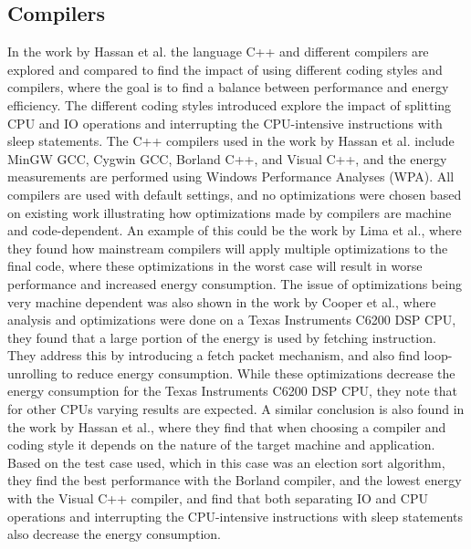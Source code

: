 \subsection{Compilers}
In the work by Hassan et al.\cite{hassan2017} the language C++ and different compilers are explored and compared to find the impact of using different coding styles and compilers, where the goal is to find a balance between performance and energy efficiency. The different coding styles introduced explore the impact of splitting CPU and IO operations and interrupting the CPU-intensive instructions with sleep statements. The C++ compilers used in the work by Hassan et al.\cite{hassan2017} include MinGW GCC, Cygwin GCC, Borland C++, and Visual C++, and the energy measurements are performed using Windows Performance Analyses (WPA). All compilers are used with default settings, and no optimizations were chosen based on existing work illustrating how optimizations made by compilers are machine and code-dependent\cite{lima2013}. An example of this could be the work by Lima et al.\cite{lima2013}, where they found how mainstream compilers will apply multiple optimizations to the final code, where these optimizations in the worst case will result in worse performance and increased energy consumption. The issue of optimizations being very machine dependent was also shown in the work by Cooper et al.\cite{cooper2004}, where analysis and optimizations were done on a Texas Instruments C6200 DSP CPU, they found that a large portion of the energy is used by fetching instruction. They address this by introducing a fetch packet mechanism, and also find loop-unrolling to reduce energy consumption. While these optimizations decrease the energy consumption for the Texas Instruments C6200 DSP CPU, they note that for other CPUs varying results are expected. A similar conclusion is also found in the work by Hassan et al.\cite{hassan2017}, where they find that when choosing a compiler and coding style it depends on the nature of the target machine and application. Based on the test case used, which in this case was an election sort algorithm, they find the best performance with the Borland compiler, and the lowest energy with the Visual C++ compiler, and find that both separating IO and CPU operations and interrupting the CPU-intensive instructions with sleep statements also decrease the energy consumption.